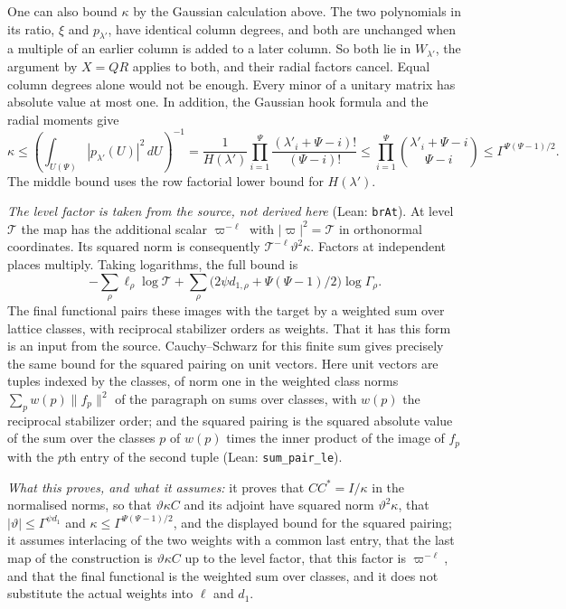 \documentclass[11pt,letterpaper]{article}
\begin{document}
One can also bound $\kappa$ by the Gaussian calculation above. The two
polynomials in its ratio, $\xi$ and $p_{\lambda'}$, have identical column degrees, and both are unchanged
when a multiple of an earlier column is added to a later column. So both lie in $W_{\lambda'}$, the
argument by $X=QR$ applies to both, and their radial factors cancel. Equal column degrees alone would not
be enough. Every minor of a unitary matrix has absolute value
at most one. In addition, the Gaussian hook formula and the radial
moments give
\begin{equation}\label{D:183}
 \kappa\le\left(\int_{U(\Psi)} |p_{\lambda'}(U)|^2\,dU\right)^{-1}
 =\frac{1}{H(\lambda')}\prod_{i=1}^\Psi
       \frac{(\lambda'_i+\Psi-i)!}{(\Psi-i)!}
 \le\prod_{i=1}^\Psi {\lambda'_i+\Psi-i\choose \Psi-i}
 \le \Gamma^{\Psi(\Psi-1)/2}.
\end{equation}
The middle bound uses the row factorial lower bound for $H(\lambda')$.

\emph{The level factor is taken from the source, not derived here} (Lean: \texttt{brAt}).
At level $\mathcal T$ the map has the additional scalar
$\varpi^{-\ell}$ with $|\varpi|^2=\mathcal T$ in orthonormal coordinates. Its
squared norm is consequently $\mathcal T^{-\ell}\vartheta^2\kappa$.
Factors at independent places multiply. Taking logarithms, the full
bound is
\begin{equation}\label{D:184}
 -\sum_\rho \ell_\rho\log\mathcal T+
 \sum_\rho\bigl(2\psi d_{1,\rho}+\Psi(\Psi-1)/2\bigr)\log \Gamma_\rho .
\end{equation}
The final functional pairs these images with the target by a weighted
sum over lattice classes, with reciprocal stabilizer orders as weights. That it has this form is an input
from the source. Cauchy--Schwarz for this finite sum gives precisely the same bound for
the squared pairing on unit vectors. Here unit vectors are tuples indexed by the classes, of norm one in
the weighted class norms $\sum_pw(p)\|f_p\|^2$ of the paragraph on sums over classes, with $w(p)$ the
reciprocal stabilizer order; and the squared pairing is the squared absolute value of the sum over the
classes $p$ of $w(p)$ times the inner product of the image of $f_p$ with the $p$th entry of the second
tuple (Lean: \texttt{sum\_pair\_le}).

\emph{What this proves, and what it assumes:} it proves that $CC^*=I/\kappa$ in the normalised norms, so
that $\vartheta\kappa C$ and its adjoint have squared norm $\vartheta^2\kappa$, that
$|\vartheta|\le\Gamma^{\psi d_1}$ and $\kappa\le\Gamma^{\Psi(\Psi-1)/2}$, and the displayed bound for the
squared pairing; it assumes interlacing of the two weights with a common last entry, that the last map of
the construction is $\vartheta\kappa C$ up to the level factor, that this factor is $\varpi^{-\ell}$, and
that the final functional is the weighted sum over classes, and it does not substitute the actual weights
into $\ell$ and $d_1$.
\end{document}
